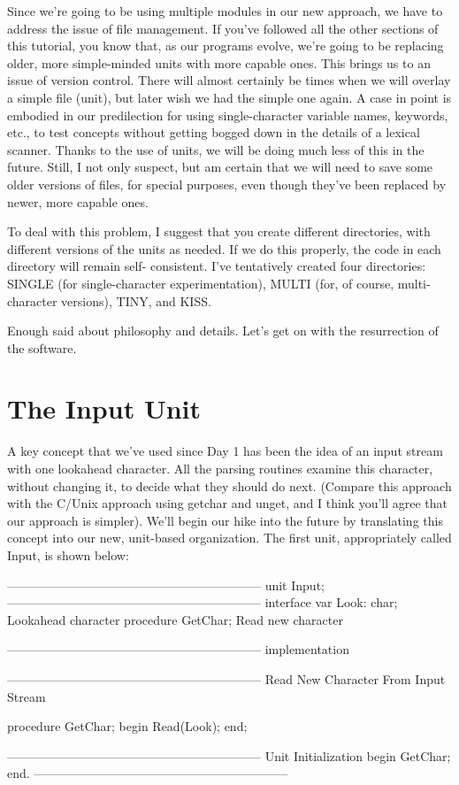 \documentclass[float=false, crop=false]{standalone}
\begin{document}
Since we're going to be using multiple modules in our new approach, we have to
address the issue of file management. If you've followed all the other sections
of this tutorial, you know that, as our programs evolve, we're going to be
replacing older, more simple-minded units with more capable ones. This brings us
to an issue of version control. There will almost certainly be times when we
will overlay a simple file (unit), but later wish we had the simple one again. A
case in point is embodied in our predilection for using single-character
variable names, keywords, etc., to test concepts without getting bogged down in
the details of a lexical scanner. Thanks to the use of units, we will be doing
much less of this in the future. Still, I not only suspect, but am certain that
we will need to save some older versions of files, for special purposes, even
though they've been replaced by newer, more capable ones.

To deal with this problem, I suggest that you create different directories, with
different versions of the units as needed. If we do this properly, the code in
each directory will remain self- consistent. I've tentatively created four
directories: SINGLE (for single-character experimentation), MULTI (for, of
course, multi-character versions), TINY, and KISS.

Enough said about philosophy and details. Let's get on with the resurrection of
the software.


\section{The Input Unit}

A key concept that we've used since Day 1 has been the idea of an input stream
with one lookahead character. All the parsing routines examine this character,
without changing it, to decide what they should do next. (Compare this approach
with the C/Unix approach using getchar and unget, and I think you'll agree that
our approach is simpler). We'll begin our hike into the future by translating
this concept into our new, unit-based organization. The first unit,
appropriately called Input, is shown below:

\begin{code}
{--------------------------------------------------------------}
unit Input;
{--------------------------------------------------------------}
interface
var Look: char;              	{ Lookahead character }
procedure GetChar;            { Read new character  }

{--------------------------------------------------------------}
implementation

{--------------------------------------------------------------}
{ Read New Character From Input Stream }

procedure GetChar;
begin
	Read(Look);
end;

{--------------------------------------------------------------}
{ Unit Initialization }
begin
	GetChar;
end.
{--------------------------------------------------------------}
\end{code}
\end{document}
